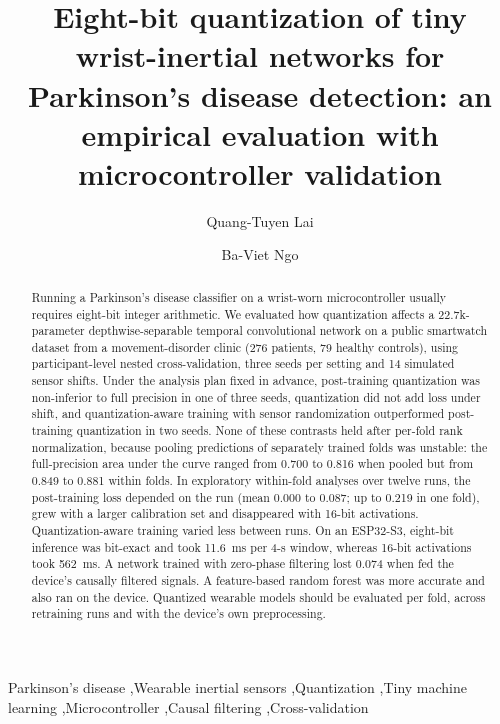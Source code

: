 \documentclass[preprint,12pt]{elsarticle}
\begin{document}
\begin{frontmatter}

\title{Eight-bit quantization of tiny wrist-inertial networks for Parkinson's disease detection: an empirical evaluation with microcontroller validation}

\author[hcmute]{Quang-Tuyen Lai}

\author[hcmute]{Ba-Viet Ngo}


\begin{abstract}
Running a Parkinson's disease classifier on a wrist-worn microcontroller usually requires eight-bit integer arithmetic. We evaluated how quantization affects a 22.7k-parameter depthwise-separable temporal convolutional network on a public smartwatch dataset from a movement-disorder clinic (276 patients, 79 healthy controls), using participant-level nested cross-validation, three seeds per setting and 14 simulated sensor shifts. Under the analysis plan fixed in advance, post-training quantization was non-inferior to full precision in one of three seeds, quantization did not add loss under shift, and quantization-aware training with sensor randomization outperformed post-training quantization in two seeds. None of these contrasts held after per-fold rank normalization, because pooling predictions of separately trained folds was unstable: the full-precision area under the curve ranged from 0.700 to 0.816 when pooled but from 0.849 to 0.881 within folds. In exploratory within-fold analyses over twelve runs, the post-training loss depended on the run (mean 0.000 to 0.087; up to 0.219 in one fold), grew with a larger calibration set and disappeared with 16-bit activations. Quantization-aware training varied less between runs. On an ESP32-S3, eight-bit inference was bit-exact and took 11.6~ms per 4-s window, whereas 16-bit activations took 562~ms. A network trained with zero-phase filtering lost 0.074 when fed the device's causally filtered signals. A feature-based random forest was more accurate and also ran on the device. Quantized wearable models should be evaluated per fold, across retraining runs and with the device's own preprocessing.
\end{abstract}

\begin{keyword}
Parkinson's disease \sep Wearable inertial sensors \sep Quantization \sep Tiny machine learning \sep Microcontroller \sep Causal filtering \sep Cross-validation
\end{keyword}

\end{frontmatter}
\end{document}
